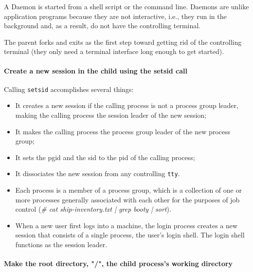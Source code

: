 A Daemon is started from a shell script or the command line.
Daemons are unlike application programs because they are not interactive, i.e., they run in the background and, as a result, do not have the controlling terminal.

The parent forks and exits as the first step toward getting rid of the controlling terminal (they only need a terminal interface long enough to get started).



\paragraph{\textbf{Create a new session in the child using the setsid call}}

Calling \texttt{setsid} accomplishes several things:
\begin{itemize}
%
\item It creates a new session if the calling process is not a process group leader, making the calling process the session leader of the new session;
\item It makes the calling process the process group leader of the new process group;
\item It sets the \gls{pgid} and the \gls{sid} to the \gls{pid} of the calling process;
\item It dissociates the new session from any controlling \texttt{tty}.
%

%
\item Each process is a member of a process group, which is a collection of one or more processes generally associated with each other for the purposes of job control (\textit{\# cat ship-inventory.txt | grep booty | sort}).
\item When a new user first logs into a machine, the login process creates a new session that consists of a single process, the user’s login shell. The login shell functions as the session leader.
%
\end{itemize}

\paragraph{\textbf{Make the root directory, "/", the child process's working directory}}

